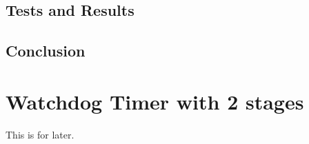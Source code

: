 \subsection{Tests and Results}

\subsection{Conclusion}

\section{Watchdog Timer with 2 stages}
This is for later.